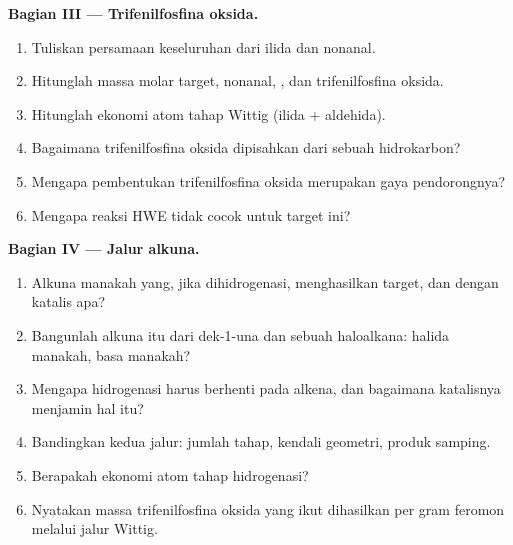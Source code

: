 \begin{problem}
\medskip
\noindent\textbf{Bagian III --- Trifenilfosfina oksida.}
\begin{enumerate}[resume]
  \item Tuliskan persamaan keseluruhan dari ilida dan nonanal.
  \item Hitunglah massa molar target, nonanal, , dan
        trifenilfosfina oksida.
  \item Hitunglah ekonomi atom tahap Wittig (ilida + aldehida).
  \item Bagaimana trifenilfosfina oksida dipisahkan dari sebuah hidrokarbon?
  \item Mengapa pembentukan trifenilfosfina oksida merupakan gaya pendorongnya?
  \item Mengapa reaksi HWE tidak cocok untuk target ini?
\end{enumerate}

\medskip
\noindent\textbf{Bagian IV --- Jalur alkuna.}
\begin{enumerate}[resume]
  \item Alkuna manakah yang, jika dihidrogenasi, menghasilkan target, dan
        dengan katalis apa?
  \item Bangunlah alkuna itu dari dek-1-una dan sebuah haloalkana: halida
        manakah, basa manakah?
  \item Mengapa hidrogenasi harus berhenti pada alkena, dan bagaimana
        katalisnya menjamin hal itu?
  \item Bandingkan kedua jalur: jumlah tahap, kendali geometri, produk samping.
  \item Berapakah ekonomi atom tahap hidrogenasi?
  \item Nyatakan massa trifenilfosfina oksida yang ikut dihasilkan per gram
        feromon melalui jalur Wittig.
\end{enumerate}
\end{problem}
